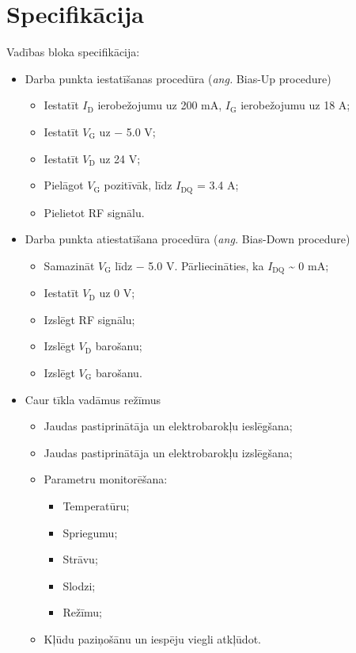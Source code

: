 \chapter{Specifikācija}
Vadības bloka specifikācija:
\begin{itemize}
    \item Darba punkta iestatīšanas procedūra (\textit{ang.} Bias-Up procedure)
    \begin{itemize}
        \item Iestatīt \( I_{\text{D}} \) ierobežojumu uz 200 mA, \( I_{\text{G}} \) ierobežojumu uz 18 A;
        \item Iestatīt \( V_{\text{G}} \) uz − 5.0 V;
        \item Iestatīt \( V_{\text{D}} \) uz 24 V;
        \item Pielāgot \( V_{\text{G}} \) pozitīvāk, līdz \( I_{\text{DQ}} \) = 3.4 A;
        \item Pielietot RF signālu.
    \end{itemize}
    \item Darba punkta atiestatīšana procedūra (\textit{ang.} Bias-Down procedure)
    \begin{itemize}
        \item Samazināt \( V_{\text{G}} \) līdz − 5.0 V. Pārliecināties, ka \( I_{\text{DQ}} \) \~{} 0 mA;
        \item Iestatīt \( V_{\text{D}} \) uz 0 V;
        \item Izslēgt RF signālu;
        \item Izslēgt \( V_{\text{D}} \) barošanu;
        \item Izslēgt \( V_{\text{G}} \) barošanu.
    \end{itemize}
    \item Caur tīkla vadāmus režīmus
    \begin{itemize}
        \item Jaudas pastiprinātāja un elektrobarokļu ieslēgšana;
        \item Jaudas pastiprinātāja un elektrobarokļu izslēgšana;
        \item Parametru monitorēšana:
        \begin{itemize}
            \item Temperatūru; 
            \item Spriegumu;
            \item Strāvu;
            \item Slodzi;
            \item Režīmu;
    \end{itemize}
        \item Kļūdu paziņošānu un iespēju viegli atkļūdot. 
    \end{itemize}
\end{itemize}

